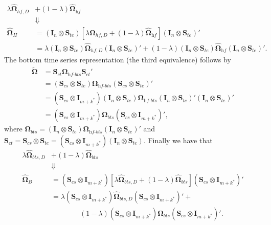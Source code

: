 \documentclass[a4paper,11pt]{article}
\newcommand{\Ivet}{\bm{I}}
\newcommand{\Svet}{\bm{S}}
\newcommand{\Omegavet}{\bm{\Omega}}
\theoremstyle{definition}
\begin{document}
\begin{align*}
	\lambda \widehat{\Omegavet}_{hf, D} &+ (1-\lambda) \widehat{\Omegavet}_{\textit{hf}}\\
	&\Downarrow\\
	\widehat{\Omegavet}_{H} & = (\Ivet_{n} \otimes \Svet_{te})\left[\lambda \widehat{\Omegavet}_{hf, D} + (1-\lambda) \widehat{\Omegavet}_{\textit{hf}}\right] (\Ivet_{n} \otimes \Svet_{te})'                                                                                                            \\
	                        & = \lambda (\Ivet_{n} \otimes \Svet_{te})\widehat{\Omegavet}_{hf, D}(\Ivet_{n} \otimes \Svet_{te})' + (1-\lambda) (\Ivet_{n} \otimes \Svet_{te})\widehat{\Omegavet}_{\textit{hf}}(\Ivet_{n} \otimes \Svet_{te})'.
\end{align*}
The bottom time series representation (the third equivalence) follows by
\begin{align*}
	\widetilde{\Omegavet} & = \Svet_{ct}\Omegavet_{\textit{hf-bts}}\Svet_{ct}'                                                                                                                                                   \\
	          & = \left(\Svet_{cs} \otimes \Svet_{te}\right)\Omegavet_{\textit{hf-bts}}\left(\Svet_{cs} \otimes \Svet_{te}\right)'                                                                                   \\
	          & = \left(\Svet_{cs} \otimes \Ivet_{m+k^\ast}\right)\left(\Ivet_n \otimes \Svet_{te}\right)\Omegavet_{\textit{hf-bts}}\left(\Ivet_n \otimes \Svet_{te}\right)'\left(\Ivet_n \otimes \Svet_{te}\right)' \\
	          & = \left(\Svet_{cs} \otimes \Ivet_{m+k^\ast}\right)\Omegavet_{bts}\left(\Svet_{cs} \otimes \Ivet_{m+k^\ast}\right)',
\end{align*}
where $\Omegavet_{bts} = \left(\Ivet_n \otimes \Svet_{te}\right)\Omegavet_{\textit{hf-bts}}\left(\Ivet_n \otimes \Svet_{te}\right)'$ and $\Svet_{ct} = \Svet_{cs} \otimes \Svet_{te} = \left(\Svet_{cs} \otimes \Ivet_{m+k^\ast}\right)\left(\Ivet_n \otimes \Svet_{te}\right)$. Finally we have that
\begin{align*}
	\lambda \widehat{\Omegavet}_{bts, D} &+ (1-\lambda) \widehat{\Omegavet}_{bts}\\
	&\Downarrow\\
	\widehat{\Omegavet}_{B} & = \left(\Svet_{cs} \otimes \Ivet_{m+k^\ast}\right)\left[\lambda \widehat{\Omegavet}_{bts, D} + (1-\lambda) \widehat{\Omegavet}_{bts}\right]\left(\Svet_{cs} \otimes \Ivet_{m+k^\ast}\right)'                       \\
	                        & = \lambda \left(\Svet_{cs} \otimes \Ivet_{m+k^\ast}\right)\widehat{\Omegavet}_{bts, D}\left(\Svet_{cs} \otimes \Ivet_{m+k^\ast}\right)' +             \\
	                        & \qquad \qquad (1-\lambda) \left(\Svet_{cs} \otimes \Ivet_{m+k^\ast}\right)\widehat{\Omegavet}_{bts}\left(\Svet_{cs} \otimes \Ivet_{m+k^\ast}\right)'.
\end{align*}
\end{document}
